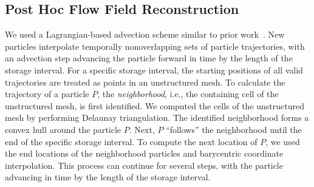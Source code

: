 \subsection{Post Hoc Flow Field Reconstruction}
\label{sec:posthoc}
We used a Lagrangian-based advection scheme similar to prior work~\cite{agranovsky2014improved, sane2018revisiting, sane2019interpolation}.
%
New particles interpolate temporally nonoverlapping sets of particle trajectories, with an advection step advancing the particle forward in time by the length of the storage interval.
%
%
%
%
For a specific storage interval, the starting positions of all valid trajectories are treated as points in an unstructured mesh.
%
To calculate the trajectory of a particle $P$, the \textit{neighborhood}, i.e., the containing cell of the unstructured mesh, is first identified.
%
We computed the cells of the unstructured mesh by performing Delaunay triangulation.
%
%
%
%
%
%
The identified neighborhood forms a convex hull around the particle $P$.
%
Next, $P$ ``follows'' the neighborhood until the end of the specific storage interval.
%
To compute the next location of $P$, we used the end locations of the neighborhood particles and barycentric coordinate interpolation.
%
This process can continue for several steps, with the particle advancing in time by the length of the storage interval.
%

%
